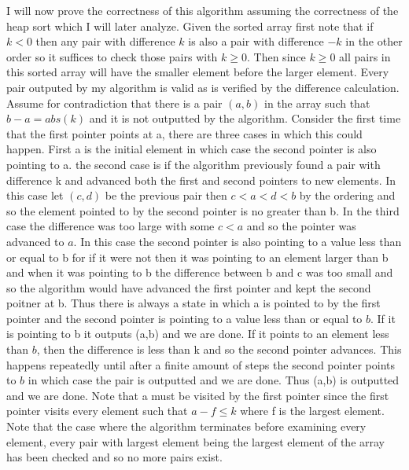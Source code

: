 \documentclass{amsart}
\begin{document}
I will now prove the correctness of this algorithm assuming the correctness of the heap sort which I will later analyze.
Given the sorted array first note that if $k < 0$ then any pair with difference $k$ is also a pair with difference $-k$ in the other order
so it suffices to check those pairs with $k \ge 0$. Then since $k \ge 0$ all pairs in this sorted array will have the smaller element before the larger element.
Every pair outputed by my algorithm is valid as is verified by the difference calculation. Assume for contradiction
that there is a pair $(a,b)$ in the array such that $b-a = abs(k)$ and  it is not outputted by the algorithm. Consider the first time that
the first pointer points at a, there are three cases in which this could happen. First a is the initial element in which case the second pointer is also pointing to a.
the second case is if the algorithm previously found a pair with difference k and advanced both the first and second pointers to new elements. In this case let  $(c,d)$ be the
previous pair then $c < a < d < b$ by the ordering and so the element pointed to by the second pointer is no greater than b. In the third case the difference was too large with some $c < a$ and so
the pointer was advanced to $a$. In this case the second pointer is also pointing to a value less than or equal to b for if it were not then it was pointing to an element larger than b and when it was pointing to b the difference between b and c
was too small and so the algorithm would have advanced the first pointer and kept the second poitner at b. Thus there is always a state in which a is pointed to by the first pointer
and the second pointer is pointing to a value less than or equal to $b$. If it is pointing to b it outputs (a,b) and we are done.
If it points to an element less than $b$, then the difference is less than k and so the second pointer advances. This happens repeatedly until
after a finite amount of steps the second pointer points to $b$ in which case the pair is outputted and we are done. Thus (a,b) is outputted and we are done. Note that
a must be visited by the first pointer since the first pointer visits every element such that $a-f \le k$ where f is the largest element. Note that the case where the algorithm terminates before examining every element, every
pair with largest element being the largest element of the array has been checked and so no more pairs exist.\\
\end{document}
